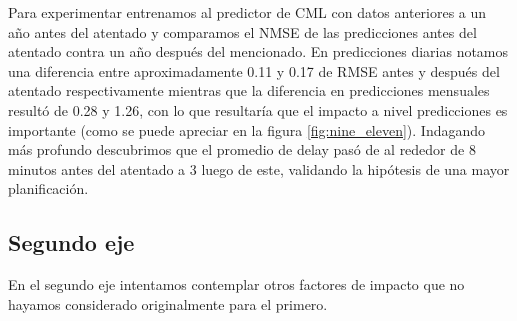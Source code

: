 Para experimentar entrenamos al predictor de CML con datos anteriores a un año antes del atentado y comparamos el NMSE de las predicciones antes del atentado contra un año después del mencionado. En predicciones diarias notamos una diferencia entre aproximadamente 0.11 y 0.17 de RMSE antes y después del atentado respectivamente mientras que la diferencia en predicciones mensuales resultó de 0.28 y 1.26, con lo que resultaría que el impacto a nivel predicciones es importante (como se puede apreciar en la figura \ref{fig:nine_eleven}). Indagando más profundo descubrimos que el promedio de delay pasó de al rededor de 8 minutos antes del atentado a 3 luego de este, validando la hipótesis de una mayor planificación.

\subsection{Segundo eje}
En el segundo eje intentamos contemplar otros factores de impacto que no hayamos considerado originalmente para el primero.

